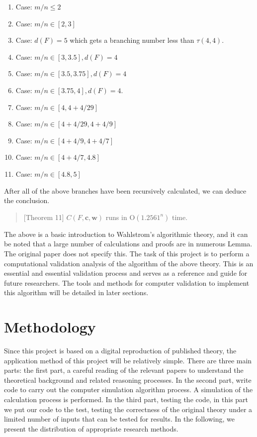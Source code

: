 \documentclass{sigchi}
\begin{document}
\begin{enumerate}
	\item Case: $m / n \leqslant2$
		\item Case: $m / n \in[2,3]$
	\item Case: $d(F)=5$ which gets a branching number less than $\tau(4,4)$.
	\item Case: $m / n \in[3,3.5], d(F)=4$
	\item Case: $m / n \in[3.5,3.75], d(F)=4$
	\item Case: $ m / n \in[3.75,4], d(F)=4 .$ 
	\item Case:  $m / n \in[4,4+4 / 29]$
	\item Case: $m / n \in[4+4 / 29,4+4 / 9]$
	\item Case: $m / n \in[4+4 / 9,4+4 / 7]$
	\item Case: $m / n \in[4+4 / 7,4.8]$
	\item Case: $m / n \in[4.8,5]$
\end{enumerate}
After all of the above branches have been recursively calculated, we can deduce the conclusion.
\begin{quote}[Theorem 11]
	$C(F, \mathbf{c}, \mathbf{w})$ runs in $\mathrm{O}\left(1.2561^{n}\right)$ time.
\end{quote}
The above is a basic introduction to Wahlstrom's algorithmic theory, and it can be noted that a large number of calculations and proofs are in numerous Lemma. The original paper does not specify this. The task of this project is to perform a computational validation analysis of the algorithm of the above theory. This is an essential and essential validation process and serves as a reference and guide for future researchers. The tools and methods for computer validation to implement this algorithm will be detailed in later sections.

\section{Methodology}
Since this project is based on a digital reproduction of published theory, the application method of this project will be relatively simple. There are three main parts: the first part, a careful reading of the relevant papers to understand the theoretical background and related reasoning processes. In the second part, write code to carry out the computer simulation algorithm process. A simulation of the calculation process is performed. In the third part, testing the code, in this part we put our code to the test, testing the correctness of the original theory under a limited number of inputs that can be tested for results. In the following, we present the distribution of appropriate research methods.
\end{document}
